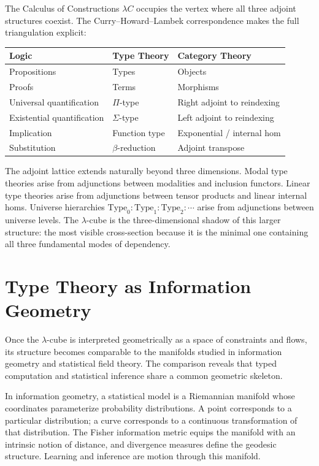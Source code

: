 \documentclass[12pt,a4paper]{article}
\theoremstyle{plain}
\theoremstyle{definition}
\newcommand{\Type}{\mathrm{Type}}
\begin{document}
The Calculus of Constructions $\lambda C$ occupies the vertex where all three
adjoint structures coexist. The Curry--Howard--Lambek correspondence makes the
full triangulation explicit:

\begin{center}
\begin{tabular}{lll}
\toprule
\textbf{Logic} & \textbf{Type Theory} & \textbf{Category Theory} \\
\midrule
Propositions & Types & Objects \\
Proofs & Terms & Morphisms \\
Universal quantification & $\Pi$-type & Right adjoint to reindexing \\
Existential quantification & $\Sigma$-type & Left adjoint to reindexing \\
Implication & Function type & Exponential / internal hom \\
Substitution & $\beta$-reduction & Adjoint transpose \\
\bottomrule
\end{tabular}
\end{center}

The adjoint lattice extends naturally beyond three dimensions. Modal type
theories arise from adjunctions between modalities and inclusion functors.
Linear type theories arise from adjunctions between tensor products and linear
internal homs. Universe hierarchies $\Type_0 : \Type_1 : \Type_2 : \cdots$
arise from adjunctions between universe levels. The $\lambda$-cube is the
three-dimensional shadow of this larger structure: the most visible
cross-section because it is the minimal one containing all three fundamental
modes of dependency.

\section{Type Theory as Information Geometry}
\label{sec:infogeo}

Once the $\lambda$-cube is interpreted geometrically as a space of constraints
and flows, its structure becomes comparable to the manifolds studied in
information geometry and statistical field theory. The comparison reveals that
typed computation and statistical inference share a common geometric skeleton.

In information geometry, a statistical model is a Riemannian manifold whose
coordinates parameterize probability distributions. A point corresponds to a
particular distribution; a curve corresponds to a continuous transformation of
that distribution. The Fisher information metric equips the manifold with an
intrinsic notion of distance, and divergence measures define the geodesic
structure. Learning and inference are motion through this manifold.
\end{document}
